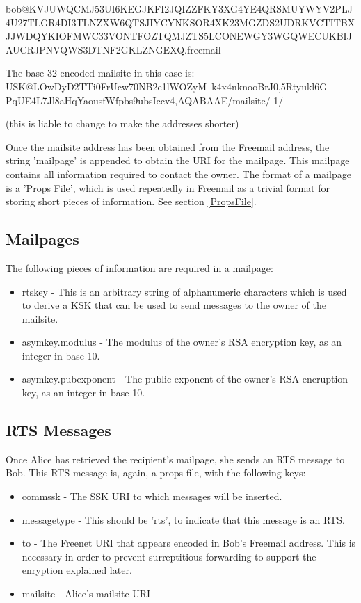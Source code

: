 \documentclass[12pt,a4paper]{article}
\begin{document}
bob@KVJUWQCMJ53UI6KEGJKFI2JQIZZFKY3XG4YE4QRSMUYWYV2PLJ4U27TLGR4DI3TLNZXW6QTSJIYCYNKSOR4XK23MGZDS2UDRKVCTITBXJJWDQYKIOFMWC33VONTFOZTQMJZTS5LCONEWGY3WGQWECUKBIJAUCRJPNVQWS3DTNF2GKLZNGEXQ.freemail

The base 32 encoded mailsite in this case is: USK@LOwDyD2TTi0FrUcw70NB2e1lWOZyM~k4x4nknooBrJ0,5Rtyukl6G-PqUE4L7Jl8aHqYaousfWfpbs9ubsIccv4,AQABAAE/mailsite/-1/

(this is liable to change to make the addresses shorter)

Once the mailsite address has been obtained from the Freemail address, the string 'mailpage' is appended to obtain the URI for the mailpage. This mailpage contains all information required to contact the owner. The format of a mailpage is a 'Props File', which is used repeatedly in Freemail as a trivial format for storing short pieces of information. See section \ref{PropsFile}.

\subsection{Mailpages}
The following pieces of information are required in a mailpage:

\begin{itemize}
\item rtskey - This is an arbitrary string of alphanumeric characters which is used to derive a KSK that can be used to send messages to the owner of the mailsite.
\item asymkey.modulus - The modulus of the owner's RSA encryption key, as an integer in base 10.
\item asymkey.pubexponent - The public exponent of the owner's RSA encruption key, as an integer in base 10.
\end{itemize}

\subsection{RTS Messages}
Once Alice has retrieved the recipient's mailpage, she sends an RTS message to Bob. This RTS message is, again, a props file, with the following keys:

\begin{itemize}
\item commssk - The SSK URI to which messages will be inserted.
\item messagetype - This should be 'rts', to indicate that this message is an RTS.
\item to - The Freenet URI that appears encoded in Bob's Freemail address. This is necessary in order to prevent surreptitious forwarding to support the enryption explained later.
\item mailsite - Alice's mailsite URI
\end{itemize}
\end{document}

